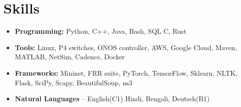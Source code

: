 \section{Skills}

\vspace{1pt}

\begin{itemize}

\item \textbf{Programming:} Python, C++, Java, Bash, SQL C, Rust

\vspace{1pt}

\item \textbf{Tools:} Linux,  P4 switches, ONOS controller, AWS, Google Cloud, Maven, MATLAB, NetSim, Cadence, Docker

\vspace{1pt}

\item \textbf{Frameworks:} Mininet, FRR suite, PyTorch, TensorFlow, Sklearn, NLTK, Flask, SciPy, Scapy, BeautifulSoup, ns3

\item \textbf{Natural Languages} -- English(C1) Hindi, Bengali, Deutsch(B1)

\end{itemize}